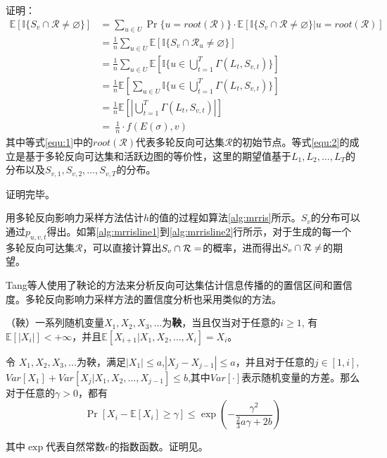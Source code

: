 \noindent 证明：
\begin{align}
    \mathbb{E}[\mathbb{I}\{S_v\cap \mathcal{R} \ne \varnothing  \}] &=\sum_{u \in U}\Pr\{ u=root(\mathcal{R})\}\cdot \mathbb{E}[\mathbb{I}\{S_v \cap \mathcal{R}\ne\varnothing \}|u=root(\mathcal{R})] \label{equ:1} \\ 
    &= \frac{1}{n}\sum_{u \in U}\mathbb{E}[\mathbb{I}\{S_v \cap \mathcal{R}_u \ne \varnothing \}] \\ 
    &=  \frac{1}{n}\sum_{u \in U}\mathbb{E}\left[\mathbb{I}\{u\in \bigcup_{t=1}^{T}\Gamma(L_t,S_{v,t})\}\right]  \label{equ:2}\\ 
    &= \frac{1}{n} \mathbb{E}\left[\sum_{u \in U}\mathbb{I}\{u\in \bigcup_{t=1}^{T}\Gamma(L_t,S_{v,t})\}\right] \\ 
    &= \frac{1}{n}\mathbb{E}\left[\left|\bigcup_{t=1}^T\Gamma(L_t,S_{v,t})\right|\right] \\ 
    &=\ \frac{1}{n}\cdot f(E(\sigma),v)    
\end{align}
其中等式\ref{equ:1}中的$root(\mathcal{R})$代表多轮反向可达集$\mathcal{R}$的初始节点。等式\ref{equ:2}的成立是基于多轮反向可达集和活跃边图的等价性，这里的期望值基于$L_1,L_2,\ldots, L_T$的分布以及$S_{v,1},S_{v,2},\ldots,S_{v,T}$的分布。

\noindent 证明完毕。

用多轮反向影响力采样方法估计$h$的值的过程如算法\ref{alg:mrris}所示。$S_v$的分布可以通过$p_{u,v,t}$得出。如第\ref{alg:mrrisline1}到\ref{alg:mrrisline2}行所示，对于生成的每一个多轮反向可达集$\mathcal{R}$，可以直接计算出$S_v \cap \mathcal{R} = \empty$的概率，进而得出$S_v \cap \mathcal{R} \neq \empty$的期望。

Tang等人\cite{IMM}使用了鞅论的方法来分析反向可达集估计信息传播的的置信区间和置信度。多轮反向影响力采样方法的置信度分析也采用类似的方法。

\begin{definition}
\label{def:marginal}
（鞅）一系列随机变量$X_1,X_2,X_3,\ldots$为{\bfseries 鞅}，当且仅当对于任意的$i\ge1$, 有$\mathbb{E}[|X_i|]<+\infty$，并且$\mathbb{E}[X_{i+1}|X_1,X_2,\ldots,X_i]=X_i$。
\end{definition}

\begin{lemma}
\label{lem:mar}
令 $X_1,X_2,X_3,\ldots$为鞅，满足$|X_1|\le a$,$|X_j-X_{j-1}|\le a$，并且对于任意的$j\in[1,i]$,$Var[X_1]+Var[X_j|X_1,X_2,\ldots,X_{j-1}]\le b$,其中$Var[\cdot]$表示随机变量的方差。那么对于任意的$\gamma > 0$，都有
\begin{equation}
\Pr\left[X_i-\mathbb{E}[X_i] \ge \gamma\right]\le \exp\left(-\frac{\gamma^2}{\frac{2}{3}a\gamma +2b}\right)
\end{equation}
\end{lemma}
其中$\exp$代表自然常数$e$的指数函数。证明见\parencite{chung2006concentration}。


